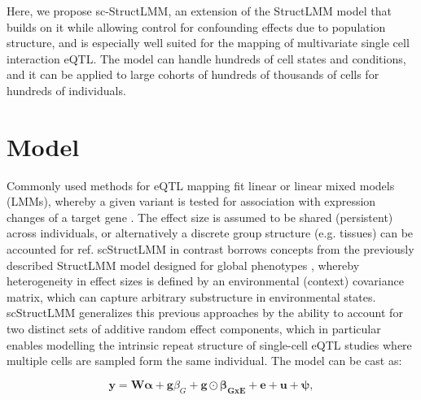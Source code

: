 Here, we propose sc-StructLMM, an extension of the StructLMM model that builds on it while allowing control for confounding effects due to population structure, and is especially well suited for the mapping of multivariate single cell interaction eQTL. 
The model can handle hundreds of cell states and conditions, and it can be applied to large cohorts of hundreds of thousands of cells for hundreds of  individuals.

\newpage

\section{Model} 

Commonly used methods for eQTL mapping fit linear or linear mixed models (LMMs),  whereby a given variant is tested for association with expression changes of a target gene \cite{kilpinen2017common}. 
The effect size is assumed to be shared (persistent) across individuals, or alternatively a discrete group structure (e.g. tissues) can be accounted for {ref}. 
scStructLMM in contrast borrows concepts from the previously described StructLMM model designed for global phenotypes \cite{moore2019linear}, whereby heterogeneity in effect sizes is defined by an environmental (context) covariance matrix, which can capture arbitrary substructure in environmental states. 
scStructLMM generalizes this previous approaches by the ability to  account for two distinct sets of additive random effect components, which in particular enables modelling the intrinsic repeat structure of single-cell eQTL studies where multiple cells are sampled form the same individual. 
The model can be cast as:

\begin{equation}\label{eq:scStructLMM}
 \mathbf{y} =  \mathbf{W}\boldsymbol{\alpha} + \mathbf{g}\beta_G + \mathbf{g} \odot \boldsymbol{\beta_{GxE}} + \mathbf{e} + \mathbf{u} + \boldsymbol{\psi}, 
\end{equation}


